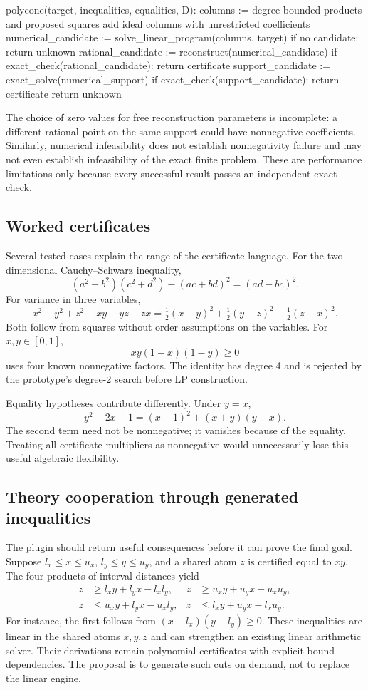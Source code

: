 \documentclass[11pt,a4paper]{article}
\begin{document}
\begin{Code}
polycone(target, inequalities, equalities, D):
  columns := degree-bounded products and proposed squares
  add ideal columns with unrestricted coefficients
  numerical_candidate := solve_linear_program(columns, target)
  if no candidate: return unknown
  rational_candidate := reconstruct(numerical_candidate)
  if exact_check(rational_candidate): return certificate
  support_candidate := exact_solve(numerical_support)
  if exact_check(support_candidate): return certificate
  return unknown
\end{Code}

The choice of zero values for free reconstruction parameters is incomplete:
a different rational point on the same support could have nonnegative
coefficients. Similarly, numerical infeasibility does not establish
nonnegativity failure and may not even establish infeasibility of the exact
finite problem. These are performance limitations only because every
successful result passes an independent exact check.

\subsection{Worked certificates}

Several tested cases explain the range of the certificate language.
For the two-dimensional Cauchy--Schwarz inequality,
\[
 (a^2+b^2)(c^2+d^2)-(ac+bd)^2=(ad-bc)^2.
\]
For variance in three variables,
\[
 x^2+y^2+z^2-xy-yz-zx
 =\tfrac12(x-y)^2+\tfrac12(y-z)^2+\tfrac12(z-x)^2.
\]
Both follow from squares without order assumptions on the variables.
For $x,y\in[0,1]$,
\[
 xy(1-x)(1-y)\geq0
\]
uses four known nonnegative factors. The identity has degree 4 and is rejected
by the prototype's degree-2 search before LP construction.

Equality hypotheses contribute differently. Under $y=x$,
\[
 y^2-2x+1=(x-1)^2+(x+y)(y-x).
\]
The second term need not be nonnegative; it vanishes because of the equality.
Treating all certificate multipliers as nonnegative would unnecessarily lose
this useful algebraic flexibility.

\subsection{Theory cooperation through generated inequalities}

The plugin should return useful consequences before it can prove the final
goal. Suppose $l_x\leq x\leq u_x$, $l_y\leq y\leq u_y$, and a shared atom
$z$ is certified equal to $xy$. The four products of interval distances yield
\begin{align*}
 z&\geq l_x y+l_y x-l_xl_y, &
 z&\geq u_x y+u_y x-u_xu_y,\\
 z&\leq u_x y+l_y x-u_xl_y, &
 z&\leq l_x y+u_y x-l_xu_y.
\end{align*}
For instance, the first follows from $(x-l_x)(y-l_y)\geq0$.
These inequalities are linear in the shared atoms $x,y,z$ and can strengthen
an existing linear arithmetic solver. Their derivations remain polynomial
certificates with explicit bound dependencies. The proposal is to generate
such cuts on demand, not to replace the linear engine.
\end{document}
